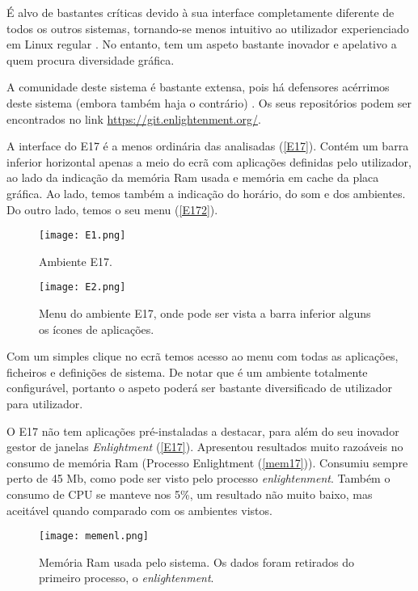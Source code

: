 \documentclass[11pt,openright,twoside]{report}
\begin{document}
É alvo de bastantes críticas devido à sua interface completamente diferente de todos os outros sistemas, tornando-se menos intuitivo ao utilizador experienciado em Linux regular \cite{CriticasE17}. No entanto, tem um aspeto bastante inovador e apelativo a quem procura diversidade gráfica.

A comunidade deste sistema é bastante extensa, pois há defensores acérrimos deste sistema (embora também haja o contrário) \cite{CriticasE17}. Os seus repositórios podem ser encontrados no link \url{https://git.enlightenment.org/}.

A interface do E17 é a menos ordinária das analisadas (\autoref{E17}). Contém um barra inferior horizontal apenas a meio do ecrã com aplicações definidas pelo utilizador, ao lado da indicação da memória Ram usada e memória em cache da placa gráfica. Ao lado, temos também a indicação do horário, do som e dos ambientes. Do outro lado, temos o seu menu (\autoref{E172}).

\begin{figure}
 \center
 \texttt{[image: E1.png]}
 \caption{Ambiente E17.}
 \label{E17}
\end{figure}

\begin{figure}
 \center
 \texttt{[image: E2.png]}
 \caption{Menu do ambiente E17, onde pode ser vista a barra inferior alguns os ícones de aplicações.}
 \label{E172}
\end{figure}

Com um simples clique no ecrã temos acesso ao menu com todas as aplicações, ficheiros e definições de sistema. De notar que é um ambiente totalmente configurável, portanto o aspeto poderá ser bastante diversificado de utilizador para utilizador.

O E17 não tem aplicações pré-instaladas a destacar, para além do seu inovador gestor de janelas \textit{Enlightment} (\autoref{E17}). Apresentou resultados muito razoáveis no consumo de memória Ram (Processo Enlightment (\autoref{mem17})). Consumiu sempre perto de 45 Mb, como pode ser visto pelo processo \textit{enlightenment}. Também o consumo de CPU se manteve nos 5\%, um resultado não muito baixo, mas aceitável quando comparado com os ambientes vistos.

\begin{figure}
 \center
 \texttt{[image: memenl.png]}
 \caption{Memória Ram usada pelo sistema. Os dados foram retirados do primeiro processo, o\textit{ enlightenment}.}
 \label{mem17}
\end{figure}
\end{document}
